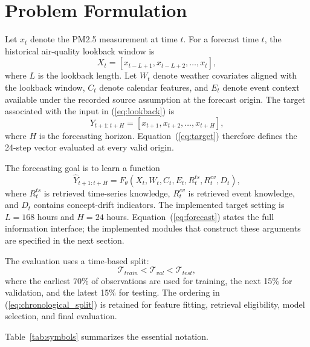 \section{Problem Formulation}

Let $x_t$ denote the PM2.5 measurement at time $t$. For a forecast time $t$, the historical air-quality lookback window is
\begin{equation}
    X_t = [x_{t-L+1}, x_{t-L+2}, \ldots, x_t],
    \label{eq:lookback}
\end{equation}
where $L$ is the lookback length. Let $W_t$ denote weather covariates aligned
with the lookback window, $C_t$ denote calendar features, and $E_t$ denote event
context available under the recorded source assumption at the forecast origin.
The target associated with the input in (\ref{eq:lookback}) is
\begin{equation}
    Y_{t+1:t+H} = [x_{t+1}, x_{t+2}, \ldots, x_{t+H}],
    \label{eq:target}
\end{equation}
where $H$ is the forecasting horizon.
Equation~(\ref{eq:target}) therefore defines the 24-step vector evaluated at
every valid origin.

The forecasting goal is to learn a function
\begin{equation}
    \hat{Y}_{t+1:t+H} =
    F_{\theta}(X_t, W_t, C_t, E_t, R^{ts}_t, R^{ev}_t, D_t),
    \label{eq:forecast}
\end{equation}
where $R^{ts}_t$ is retrieved time-series knowledge, $R^{ev}_t$ is retrieved event knowledge, and $D_t$ contains concept-drift indicators. The implemented target setting is $L=168$ hours and $H=24$ hours.
Equation~(\ref{eq:forecast}) states the full information interface; the
implemented modules that construct these arguments are specified in the next
section.

The evaluation uses a time-based split:
\begin{equation}
    \mathcal{T}_{train} < \mathcal{T}_{val} < \mathcal{T}_{test},
    \label{eq:chronological_split}
\end{equation}
where the earliest 70\% of observations are used for training, the next 15\%
for validation, and the latest 15\% for testing. The ordering in
(\ref{eq:chronological_split}) is retained for feature fitting, retrieval
eligibility, model selection, and final evaluation.

Table~\ref{tab:symbols} summarizes the essential notation.

